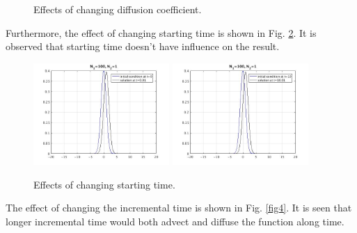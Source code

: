 \documentclass[12pt]{article}
\begin{document}
\begin{figure}[H]
\begin{center}
\caption{Effects of changing diffusion coefficient.} 
\label{fig2}
\end{center}
\end{figure}

Furthermore, the effect of changing starting time is shown in Fig. \ref{fig3}. It is observed that starting time doesn't have influence on the result.

\begin{figure}[H]
\begin{center}

\includegraphics[width=0.46\textwidth]{norm.jpg} 
\includegraphics[width=0.46\textwidth]{t10.jpg}  \\
\hspace*{0.2truecm}

\caption{Effects of changing starting time.} 
\label{fig3}
\end{center}
\end{figure}

The effect of changing the incremental time is shown in Fig. \ref{fig4}. It is seen that longer incremental time would both advect and diffuse the function along time. 
\end{document}
